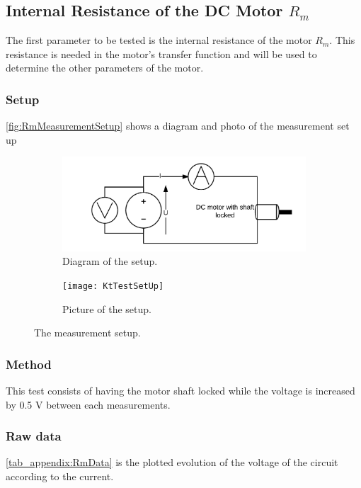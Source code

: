 \subsection{Internal Resistance of the DC Motor $R_m$}\label{sec:MeasRm}
The first parameter to be tested is the internal resistance of the motor $R_m$. This resistance is needed in the motor's transfer function and will be used to determine the other parameters of the motor. 
\subsubsection*{Setup}
\autoref{fig:RmMeasurementSetup} shows a diagram and photo of the measurement set up
\begin{figure}[htbp]
	\centering
	\begin{subfigure}{0.50\textwidth}
		\includegraphics[width=1\textwidth]{figures/appendix/Motor&GearTests/RmTestSetUpDiagram}
		\caption{Diagram of the setup.} \label{fig:LaMeasurementDiagram}
	\end{subfigure}
	\begin{subfigure}{0.40\textwidth}
			\texttt{[image: KtTestSetUp]}
		\caption{Picture of the setup.} \label{fig:LaMeasurementPictures}
	\end{subfigure}
	\caption{The measurement setup.} \label{fig:RmMeasurementSetup}   
\end{figure} 

\subsubsection*{Method}
This test consists of having the motor shaft locked while the voltage is increased by 0.5 V between each measurements.

\subsubsection*{Raw data}
\autoref{tab_appendix:RmData} is the plotted evolution of the voltage of the circuit according to the current.

